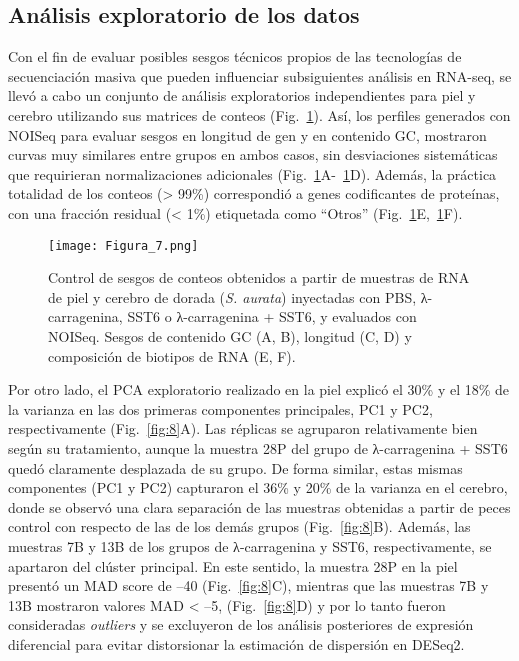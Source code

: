 \documentclass[10pt,a4paper]{article}
\begin{document}
\subsection{Análisis exploratorio de los datos}
Con el fin de evaluar posibles sesgos técnicos propios de las tecnologías de secuenciación masiva que pueden influenciar subsiguientes análisis en RNA-seq, se llevó a cabo un conjunto de análisis exploratorios independientes para piel y cerebro utilizando sus matrices de conteos (Fig.~\ref{fig:7}). Así, los perfiles generados con NOISeq para evaluar sesgos en longitud de gen y en contenido GC, mostraron curvas muy similares entre grupos en ambos casos, sin desviaciones sistemáticas que requirieran normalizaciones adicionales (Fig.~\ref{fig:7}A-~\ref{fig:7}D). Además, la práctica totalidad de los conteos (> 99\%) correspondió a genes codificantes de proteínas, con una fracción residual (< 1\%) etiquetada como “Otros” (Fig.~\ref{fig:7}E,~\ref{fig:7}F). 

\begin{figure}[ht]
  \centering
 \texttt{[image: Figura\_7.png]}
 
  \caption{Control de sesgos de conteos obtenidos a partir de muestras de RNA de piel y cerebro de dorada (\textit{S. aurata}) inyectadas con PBS, λ-carragenina, SST6 o λ-carragenina + SST6, y evaluados con NOISeq. Sesgos de contenido GC (A, B), longitud (C, D) y composición de biotipos de RNA (E, F).}
  \label{fig:7}
\end{figure}

\newpage
Por otro lado, el PCA exploratorio realizado en la piel explicó el 30\% y el 18\% de la varianza en las dos primeras componentes principales, PC1 y PC2, respectivamente (Fig.~\ref{fig:8}A). Las réplicas se agruparon relativamente bien según su tratamiento, aunque la muestra 28P del grupo de λ-carragenina + SST6 quedó claramente desplazada de su grupo. De forma similar, estas mismas componentes (PC1 y PC2) capturaron el 36\% y 20\% de la varianza en el cerebro, donde se observó una clara separación de las muestras obtenidas a partir de peces control con respecto de las de los demás grupos (Fig.~\ref{fig:8}B). Además, las muestras 7B y 13B de los grupos de λ-carragenina y SST6, respectivamente, se apartaron del clúster principal. En este sentido, la muestra 28P en la piel presentó un MAD score de –40 (Fig.~\ref{fig:8}C), mientras que las muestras 7B y 13B mostraron valores MAD < –5, (Fig.~\ref{fig:8}D) y por lo tanto fueron consideradas \textit{outliers} y se excluyeron de los análisis posteriores de expresión diferencial para evitar distorsionar la estimación de dispersión en DESeq2.
\end{document}

